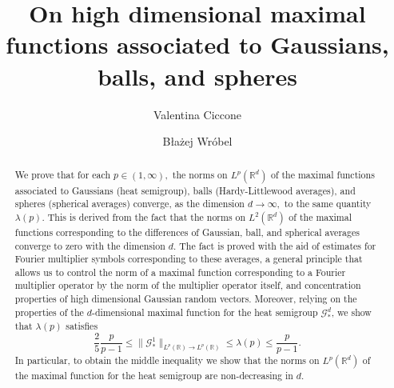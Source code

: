 \documentclass[a4paper, reqno]{amsart}
\theoremstyle{definition}
\begin{document}
\title[High dimensional maximal functions for Gaussians, balls, and spheres]{On high dimensional maximal functions associated to Gaussians, balls, and spheres}

\author{Valentina Ciccone}
\address[Valentina Ciccone]{Institute of Mathematics, Polish Academy of Sciences, Śniadeckich 8, 00-656 Warszawa, Poland}

\author{B{\l}a{\.z}ej Wr{\'o}bel}
\address[B{\l}a{\.z}ej Wr{\'o}bel]{
Institute of Mathematics
	of the Polish Academy of Sciences\\
	Śniadeckich 8\\
	00-656 Warsaw\\
	Poland \& Institute of Mathematics\\
	University of Wroc{\l}aw\\
	Plac Grun\-waldzki 2\\
	50-384 Wroc{\l}aw\\
	Poland}



\begin{abstract}
We prove that for each $p\in (1,\infty),$ the norms on $L^p(\mathbb{R}^d)$  of the maximal functions associated to Gaussians (heat semigroup), balls (Hardy-Littlewood averages), and spheres (spherical averages) converge, as the dimension $d\to \infty,$ to the same quantity $\lambda(p)$.
This is derived from the fact that the norms on $L^2(\mathbb{R}^d)$ of the maximal functions corresponding to the differences of Gaussian, ball, and spherical averages converge to zero with the dimension $d.$ The fact is proved with the aid of estimates for Fourier multiplier symbols corresponding to these averages, 
 a general principle that allows us to control the norm of a maximal function corresponding to a Fourier multiplier operator by the norm of the multiplier operator itself, and concentration properties of high dimensional Gaussian random vectors. 
Moreover, relying on the properties of the $d$-dimensional maximal function for the heat semigroup $\mathcal{G}_\ast^d$, we show that $\lambda(p)$ satisfies
$$
\frac25\frac{p}{p-1}\le\|\mathcal{G}_\ast^1\|_{L^p(\mathbb{R})\rightarrow L^p(\mathbb{R})}\le \lambda(p)\le \frac{p}{p-1}.
$$
In particular, to obtain the middle inequality we show that the norms on $L^p(\mathbb{R}^d)$ of the maximal function for the heat semigroup are non-decreasing in $d.$
\end{abstract}
\end{document}
